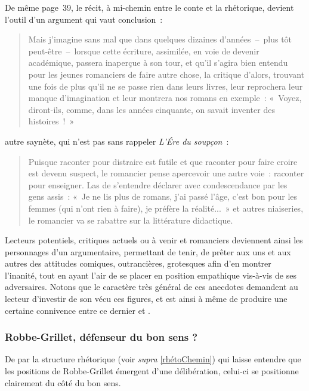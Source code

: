 \documentclass[12pt, a4paper]{article}
\begin{document}
De même page~39, le récit, à mi-chemin entre le conte et la rhétorique, devient l'outil d'un argument qui vaut conclusion~:
\begin{quote}
Mais j’imagine sans mal que dans quelques dizaines d’années~–~plus tôt peut-être~–~lorsque cette écriture, assimilée, en voie de devenir académique, passera inaperçue à son tour, et qu’il s’agira bien entendu pour les jeunes romanciers de faire autre chose, la critique d’alors, trouvant une fois de plus qu’il ne se passe rien dans leurs livres, leur reprochera leur manque d’imagination et leur montrera nos romans en exemple~: «~Voyez, diront-ils, comme, dans les années cinquante, on savait inventer des histoires~!~»
\end{quote}
autre saynète, qui n'est pas sans rappeler \textit{L'Ére du soupçon}~:
\begin{quote}
Puisque raconter pour distraire est futile et que raconter pour faire croire est devenu suspect, le romancier pense apercevoir une autre voie~: raconter pour enseigner. Las de s’entendre déclarer avec condescendance par les gens assis~: «~Je ne lis plus de romans, j’ai passé l’âge, c’est bon pour les femmes (qui n’ont rien à faire), je préfère la réalité...~» et autres niaiseries,  le romancier va se rabattre sur la littérature didactique.   
\end{quote}
Lecteurs potentiels, critiques actuels ou à venir et romanciers deviennent ainsi les personnages d'un argumentaire, permettant de tenir, de prêter aux uns et aux autres des attitudes comiques, outrancières, grotesques afin d'en montrer l'inanité, tout en ayant l'air de se placer en position empathique vis-à-vis de ses adversaires. Notons que le caractère très général de ces anecdotes demandent au lecteur d'investir de son vécu ces figures, et est ainsi à même de produire une certaine connivence entre ce dernier et \robbe. 


\subsubsection{Robbe-Grillet, défenseur du bon sens ?}
\label{bonsens}

De par la structure rhétorique (voir \textit{supra} \ref{rhétoChemin}) qui laisse entendre que les positions de Robbe-Grillet émergent d'une délibération, celui-ci se positionne clairement du côté du bon sens. 
\end{document}
